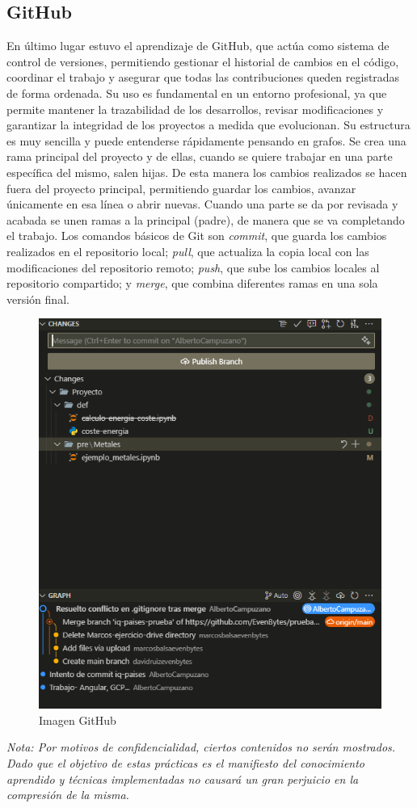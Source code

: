 \subsection{GitHub}
%
%
En último lugar estuvo el aprendizaje de GitHub, que actúa como sistema de control de versiones, permitiendo gestionar el historial de cambios en el código, coordinar el trabajo y asegurar que todas las contribuciones queden registradas de forma ordenada. Su uso es fundamental en un entorno profesional, ya que permite mantener la trazabilidad de los desarrollos, revisar modificaciones y garantizar la integridad de los proyectos a medida que evolucionan. Su estructura es muy sencilla y puede entenderse rápidamente pensando en grafos. Se crea una rama principal del proyecto y de ellas, cuando se quiere trabajar en una parte específica del mismo, salen hijas. De esta manera los cambios realizados se hacen fuera del proyecto principal, permitiendo guardar los cambios, avanzar únicamente en esa línea o abrir nuevas. Cuando una parte se da por revisada y acabada se unen ramas a la principal (padre), de manera que se va completando el trabajo. Los comandos básicos de Git son \textit{commit}, que guarda los cambios realizados en el repositorio local; \textit{pull}, que actualiza la copia local con las modificaciones del repositorio remoto; \textit{push}, que sube los cambios locales al repositorio compartido; y \textit{merge}, que combina diferentes ramas en una sola versión final.
\begin{figure}[H]
    \centering
    \includegraphics[width=0.42\linewidth]{figuras/captura_github.png}
    \caption{Imagen GitHub}
    \label{GitHub}
\end{figure}
%
%
\textit{Nota: Por motivos de confidencialidad, ciertos contenidos no serán mostrados. Dado que el objetivo de estas prácticas es el manifiesto del conocimiento aprendido y técnicas implementadas no causará un gran perjuicio en la compresión de la misma.}
